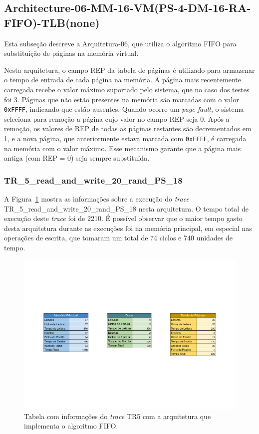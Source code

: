 \documentclass[
	12pt,				%
	oneside,   	        %
	a4paper,			%
	english,			%
	french,				%
	spanish,			%
	brazil,				%
	]{pacotes/abntex2}
\begin{document}
\subsection{Architecture-06-MM-16-VM(PS-4-DM-16-RA-FIFO)-TLB(none)}
\label{subsec:architecture-06}

Esta subseção descreve a Arquitetura-06, que utiliza o algoritmo FIFO para substituição de páginas na memória virtual.

Nesta arquitetura, o campo REP da tabela de páginas é utilizado para armazenar o tempo de entrada de cada página na memória. A página mais recentemente carregada recebe o valor máximo suportado pelo sistema, que no caso dos testes foi 3. Páginas que não estão presentes na memória são marcadas com o valor \texttt{0xFFFF}, indicando que estão ausentes. Quando ocorre um \textit{page fault}, o sistema seleciona para remoção a página cujo valor no campo REP seja 0. Após a remoção, os valores de REP de todas as páginas restantes são decrementados em 1, e a nova página, que anteriormente estava marcada com \texttt{0xFFFF}, é carregada na memória com o valor máximo. Esse mecanismo garante que a página mais antiga (com REP = 0) seja sempre substituída.

\subsubsection{TR\_5\_read\_and\_write\_20\_rand\_PS\_18}
\label{subsubsec:tr5-arch06}

A Figura~\ref{fig:tr5-arch06} mostra as informações sobre a execução do \textit{trace} TR\_5\_read\_and\_write\_20\_rand\_PS\_18 nesta arquitetura. O tempo total de execução deste \textit{trace} foi de 2210.
É possível observar que o maior tempo gasto desta arquitetura durante as execuções foi na memória principal, em especial nas operações de escrita, que tomaram um total de 74 ciclos e 740 unidades de tempo.

\begin{figure}[H]
  \centering
  \includegraphics[scale=0.5]{figuras/Architecture06-TLB(none) TR5.pdf}
  \caption{Tabela com informações do \textit{trace} TR5 com a arquitetura que implementa o algoritmo FIFO.}
  \label{fig:tr5-arch06}
\end{figure}
\end{document}
